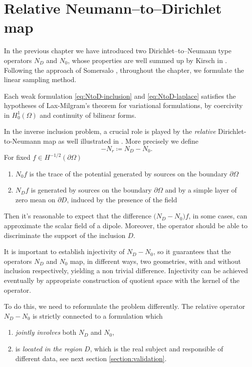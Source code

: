 \documentclass[10pt, a4paper, twoside, openright]{book}
\theoremstyle{definition}
\theoremstyle{plain}
\theoremstyle{plain}
\theoremstyle{plain}
\theoremstyle{plain}
\theoremstyle{plain}
\theoremstyle{plain}
\theoremstyle{plain}
\theoremstyle{plain}
\begin{document}
\section{Relative Neumann--to--Dirichlet map}
In the previous chapter we have introduced two Dirichlet--to--Neumann type operators ${N_D}$ and ${N_0}$, 
whose properties are well summed up by Kirsch in \cite{kirsch:book}. 
Following the approach of Somersalo \cite{somersalo:preprint}, throughout the chapter, 
we formulate the linear sampling method.
\par
Each weak formulation \eqref{eq:NtoD-inclusion} and \eqref{eq:NtoD-laplace} satisfies the hypotheses of Lax-Milgram's theorem for 
variational formulations, by coercivity in $H^1_0(\Omega)$ and continuity of bilinear forms. 
\par
In the inverse inclusion problem, a crucial role is played by the 
\textit{relative} Dirichlet-to-Neumann map as well illustrated in \cite{somersalo:preprint}. More precisely we define 
\begin{equation}
 -{N_r} \coloneqq {N_D} - {N_0}.
\end{equation}
For fixed $f\in  H^{-1/2}(\partial \Omega)$
\begin{enumerate}
 \item ${N_0} f$ is the trace of the potential generated by sources on the boundary $\partial \Omega$ 
 \item ${N_D} f$ is generated by sources on the boundary $\partial \Omega$ and by a simple layer of 
 zero mean on $\partial D$, induced by the presence of the field
\end{enumerate}
Then it's reasonable to expect that the difference $\bigl({N_D}-{N_0}\bigr)f$, in some cases, 
can approximate the scalar field of a dipole.
Moreover, the operator should be able to discriminate the support of the inclusion $D$.
\par
It is important to establish injectivity of ${N_D} - {N_0}$, so it guarantees that the operators 
${N_D}$ and ${N_0}$ map, in different ways, two geometries, with and without inclusion respectively, 
yielding a non trivial difference.
Injectivity can be achieved eventually by appropriate construction of quotient space with the kernel of the operator.
\par
To do this, we need to reformulate the problem differently.
The relative operator ${N_D} - {N_0}$ is strictly connected to a formulation which
\begin{enumerate}
 \item \emph{jointly involves} both ${N_D}$ and ${N_0}$,
 \item is \emph{located in the region} $D$, which is the real subject and responsible of different data, 
 see next section \ref{section:validation}.
\end{enumerate}
\end{document}
